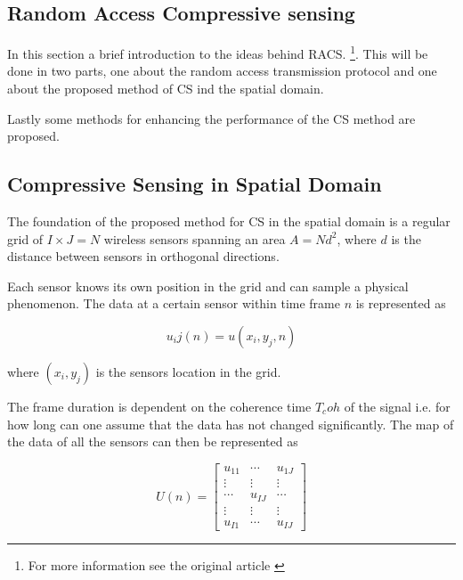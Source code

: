 \documentclass[Main]{subfiles}
\begin{document}
	





	\subsection{Random Access Compressive sensing} %
	\label{sub:random_access_compressive_sensing}

		In this section a brief introduction to the ideas behind RACS.
		\footnote{For more information see the original article \cite{Fazel2011}}.
		This will be done in two parts, one about the random access transmission protocol and one about the proposed method of CS ind the spatial domain.

		Lastly some methods for enhancing the performance of the CS method are proposed.
		
		\subsection{Compressive Sensing in Spatial Domain} %
		\label{sub:compressive_sensing_in_spatial_domain}

			The foundation of the proposed method for CS in the spatial domain is a regular grid of $I \times J = N$ wireless sensors spanning an area $A = Nd^2$, where $d$ is the distance between sensors in orthogonal directions.

			Each sensor knows its own position in the grid and can sample a physical phenomenon.
			The data at a certain sensor within time frame $n$ is represented as

			\begin{equation}
				u_ij(n) = u(x_i, y_j, n)
			\end{equation}

			where $(x_i, y_j)$ is the sensors location in the grid.

			The frame duration is dependent on the coherence time $T_coh$ of the signal i.e. for how long can one assume that the data has not changed significantly.
			The map of the data of all the sensors can then be represented as

			\begin{equation}
				U(n) =
			 	\begin{bmatrix}
			  		u_{11}	&	\cdots 	& 	u_{1J}	\\
			  		\vdots	&	\vdots	&	\vdots	\\
					\cdots 	& 	u_{IJ}	& 	\cdots 	\\
					\vdots	&	\vdots	&	\vdots	\\
					u_{I1} 	& 	\cdots 	& 	u_{IJ}
				\end{bmatrix}
			\end{equation}
\end{document}
